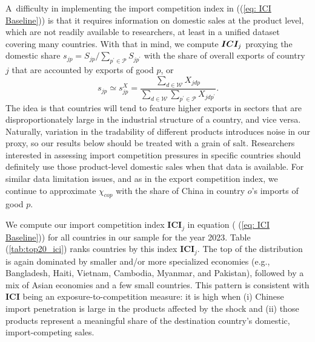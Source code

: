 \documentclass[english,12pt]{article}
\theoremstyle{definition}
\let\oldref\ref
\renewcommand{\ref}[1]{(\oldref{#1})}
\begin{document}
A\ difficulty in implementing the import competition index in (\ref{eq: ICI
Baseline}) is that it requires information on domestic sales at the product
level, which are not readily available to researchers, at least in a unified
dataset covering many countries. With that in mind, we compute $\boldsymbol{%
ICI}_{j}$ proxying the domestic share $s_{jp}=S_{jp}/\sum_{p^{\prime }\in 
\mathcal{P}}S_{jp^{\prime }}$ with the share of overall exports of country $j$
that are accounted by exports of good $p$, or%
\begin{equation}
s_{jp}\simeq s_{jp}^{X}=\frac{\sum_{d\in \mathcal{W}}X_{jdp}}{\sum_{d\in 
\mathcal{W}}\sum_{p^{\prime }\in \mathcal{P}}X_{jdp^{\prime }}}.
\label{eq: X_share}
\end{equation}%
The idea is that countries will tend to feature higher exports in sectors
that are disproportionately large in the industrial structure of a country,
and vice versa. Naturally, variation in the tradability of different
products introduces noise in our proxy, so our results below should be
treated with a grain of salt. Researchers interested in assessing import
competition pressures in specific countries should definitely use those 
product-level domestic sales when that data is available.
For similar data limitation issues, and as in the export competition index, we continue to approximate $\chi_{cop}$ with the share of China in country $o$'s imports of good $p$.

We compute our import competition index $\boldsymbol{ICI}_{j}$ in equation (%
\ref{eq: ICI Baseline}) for all countries in our sample for the year 2023.
Table \ref{tab:top20_ici} ranks countries by this index $\boldsymbol{ICI}_{j}$. The top of the distribution is again dominated by smaller and/or more specialized economies (e.g., Bangladesh, Haiti, Vietnam, Cambodia, Myanmar, and Pakistan), followed by a mix of Asian economies and a few small countries. This pattern is consistent with $\boldsymbol{ICI}$ being an exposure-to-competition measure: it is high when (i) Chinese import penetration is large in the products affected by the shock and (ii) those products represent a meaningful share of the destination country's domestic, import-competing sales.
\end{document}
